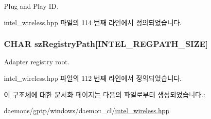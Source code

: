 Plug-\/and-\/\+Play ID. 



intel\+\_\+wireless.\+hpp 파일의 114 번째 라인에서 정의되었습니다.

\subsubsection[{\texorpdfstring{sz\+Registry\+Path}{szRegistryPath}}]{\setlength{\rightskip}{0pt plus 5cm}C\+H\+AR sz\+Registry\+Path\mbox{[}{\bf I\+N\+T\+E\+L\+\_\+\+R\+E\+G\+P\+A\+T\+H\+\_\+\+S\+I\+ZE}\mbox{]}}\hypertarget{struct_i_n_t_e_l___a_d_a_p_t_e_r___l_i_s_t___e_n_t_r_y_ad178b9652af00eb62eb340935223402c}{}\label{struct_i_n_t_e_l___a_d_a_p_t_e_r___l_i_s_t___e_n_t_r_y_ad178b9652af00eb62eb340935223402c}


Adapter registry root. 



intel\+\_\+wireless.\+hpp 파일의 112 번째 라인에서 정의되었습니다.



이 구조체에 대한 문서화 페이지는 다음의 파일로부터 생성되었습니다.\+:\begin{DoxyCompactItemize}
\item 
daemons/gptp/windows/daemon\+\_\+cl/\hyperlink{intel__wireless_8hpp}{intel\+\_\+wireless.\+hpp}\end{DoxyCompactItemize}
